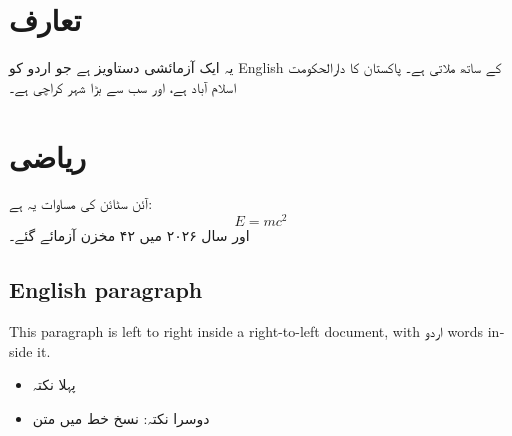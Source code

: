 \documentclass[12pt]{article}
\begin{document}
\section{تعارف}
یہ ایک آزمائشی دستاویز ہے جو اردو کو \textenglish{English} کے ساتھ ملاتی ہے۔
پاکستان کا دارالحکومت اسلام آباد ہے، اور سب سے بڑا شہر کراچی ہے۔

\section{ریاضی}
آئن سٹائن کی مساوات یہ ہے:
\begin{equation}
  E = mc^2
\end{equation}
اور سال ۲۰۲۶ میں ۴۲ مخزن آزمائے گئے۔

\begin{english}
\section{English paragraph}
This paragraph is left to right inside a right-to-left document, with
\texturdu{اردو} words inside it.
\end{english}

\begin{itemize}
  \item پہلا نکتہ
  \item دوسرا نکتہ: {\urdufontsf نسخ خط میں متن}
\end{itemize}
\end{document}
